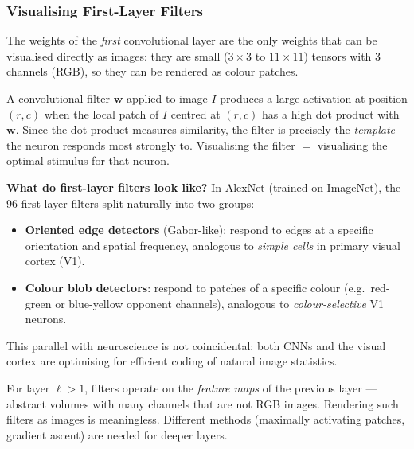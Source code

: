 \documentclass[11pt,a4paper]{article}
\begin{document}
\subsubsection{Visualising First-Layer Filters}

The weights of the \emph{first} convolutional layer are the only weights that can be visualised directly as images: they are small ($3\times3$ to $11\times11$) tensors with 3 channels (RGB), so they can be rendered as colour patches.

\begin{insightbox}
A convolutional filter $\mathbf{w}$ applied to image $I$ produces a large activation at position $(r,c)$ when the local patch of $I$ centred at $(r,c)$ has a high dot product with $\mathbf{w}$.  Since the dot product measures similarity, the filter is precisely the \emph{template} the neuron responds most strongly to.  Visualising the filter $=$ visualising the optimal stimulus for that neuron.
\end{insightbox}

\textbf{What do first-layer filters look like?}
In AlexNet (trained on ImageNet), the 96 first-layer filters split naturally into two groups:
\begin{itemize}
  \item \textbf{Oriented edge detectors} (Gabor-like): respond to edges at a specific orientation and spatial frequency, analogous to \emph{simple cells} in primary visual cortex (V1).
  \item \textbf{Colour blob detectors}: respond to patches of a specific colour (e.g.\ red-green or blue-yellow opponent channels), analogous to \emph{colour-selective} V1 neurons.
\end{itemize}
This parallel with neuroscience is not coincidental: both CNNs and the visual cortex are optimising for efficient coding of natural image statistics.

\begin{warnbox}
For layer $\ell > 1$, filters operate on the \emph{feature maps} of the previous layer — abstract volumes with many channels that are not RGB images.  Rendering such filters as images is meaningless.  Different methods (maximally activating patches, gradient ascent) are needed for deeper layers.
\end{warnbox}
\end{document}
